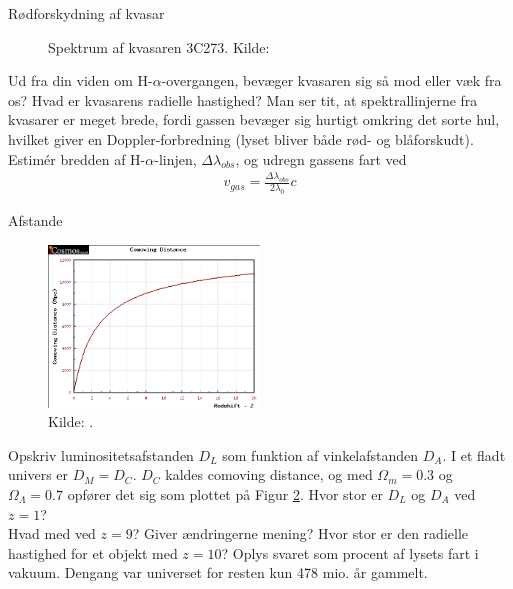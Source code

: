 \begin{opgave}{Rødforskydning af kvasar}
\begin{figure}[h!]
		\caption{Spektrum af kvasaren 3C273. Kilde: \cite{YatesGardenQuasarSpectrum}} %
		\label{kvasar}
	\end{figure}
	\opg Ud fra din viden om H-$\alpha$-overgangen, bevæger kvasaren sig så mod eller væk fra os?
	\opg Hvad er kvasarens radielle hastighed?
	\opg Man ser tit, at spektrallinjerne fra kvasarer er meget brede, fordi gassen bevæger sig hurtigt omkring det sorte hul, hvilket giver en Doppler-forbredning
	(lyset bliver både rød- og blåforskudt). Estimér bredden af H-$\alpha$-linjen, $\Delta\lambda_{obs}$, og udregn gassens fart ved 
	\begin{align}
		v_{gas}=\frac{\Delta \lambda_{obs}}{2\lambda_{0}}c
	\end{align}
\end{opgave}

\begin{opgave}{Afstande} %
	\\  		
	\begin{figure}[h!]
			\centering
			\includegraphics[width=0.5\textwidth]{opg/figurer/ComovingDistance.png}
			\caption{Kilde: \cite{vardanyanICosmosCosmologyCalculator}.} %
			\label{comoving} 
		\end{figure}
	\opg Opskriv luminositetsafstanden $D_L$ som funktion af vinkelafstanden $D_A$.
	\opg I et fladt univers er $D_M=D_C$. $D_C$ kaldes comoving distance, og med $\Omega_m=0.3$ og $\Omega_{\Lambda}=0.7$ opfører det sig som plottet på Figur \ref{comoving}. 
	Hvor stor er $D_L$ og $D_A$ ved $z=1$? \\
	Hvad med ved $z=9$? Giver ændringerne mening?
	\opg Hvor stor er den radielle hastighed for et objekt med $z=10$? Oplys svaret som procent af lysets fart i vakuum. Dengang var universet for resten kun  478 mio. år gammelt.
\end{opgave}

